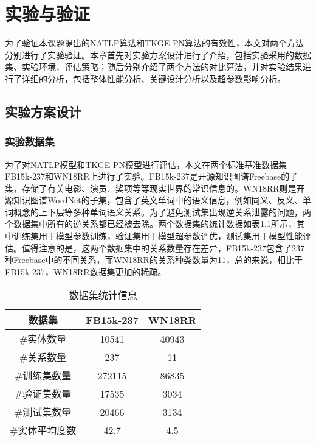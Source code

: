 \chapter{实验与验证}

为了验证本课题提出的NATLP算法和TKGE-PN算法的有效性，本文对两个方法分别进行了实验验证。本章首先对实验方案设计进行了介绍，包括实验采用的数据集、实验环境、评估策略；随后分别介绍了两个方法的对比算法，并对实验结果进行了详细的分析，包括整体性能分析、关键设计分析以及超参数影响分析。

\section{实验方案设计}

\subsection{实验数据集}
为了对NATLP模型和TKGE-PN模型进行评估，本文在两个标准基准数据集FB15k-237和WN18RR上进行了实验。FB15k-237是开源知识图谱Freebase的子集，存储了有关电影、演员、奖项等等现实世界的常识信息的。WN18RR则是开源知识图谱WordNet的子集，包含了英文单词中的语义信息，例如同义、反义、单词概念的上下层等多种单词语义关系。为了避免测试集出现逆关系泄露的问题，两个数据集中所有的逆关系都已经被去除。两个数据集的统计数据如表\ref{dataset_statistics}所示，其中训练集用于模型参数训练，验证集用于模型超参数调优，测试集用于模型性能评估。值得注意的是，这两个数据集中的关系数量存在差异，FB15k-237包含了237种Freebase中的不同关系，而WN18RR的关系种类数量为11，总的来说，相比于FB15k-237，WN18RR数据集更加的稀疏。

\begin{table}[htbp]
  \renewcommand\arraystretch{1.5}
  \caption{数据集统计信息}
  \centering
  \begin{tabular}{*{3}{c}}
    \toprule
    数据集 & FB15k-237 & WN18RR\\
    \midrule
    \#实体数量  & 10541 & 40943 \\
    \#关系数量 & 237 & 11\\
    \#训练集数量 & 272115 &86835\\
    \#验证集数量 &17535 &3034\\
    \#测试集数量 &20466 &3134\\
    \#实体平均度数 &42.7 &4.5\\
    \bottomrule
  \end{tabular}
  \label{dataset_statistics}
\end{table}

